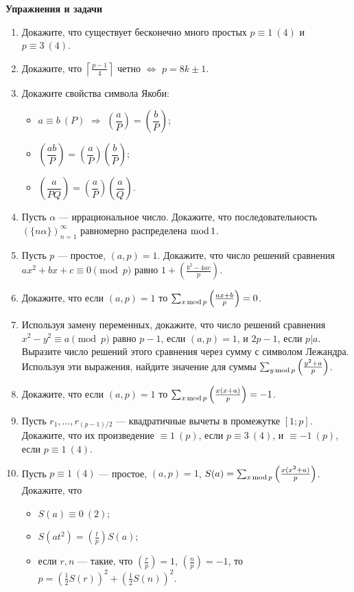 \noindent\textbf{Упражнения и задачи}

\begin{enumerate}[topsep=0pt]
    \item Докажите, что существует бесконечно много простых $p\equiv 1\ (4)$ и $p\equiv 3\ (4)$.
    \item Докажите, что $\left \lceil \frac{p-1}{4} \right \rceil $  четно $\Leftrightarrow$ $p=8k \pm 1$.
    \item Докажите свойства символа Якоби:
    \begin{itemize}[noitemsep,topsep=0pt]
        \item $a\equiv b\ (P)$ $\Rightarrow$ $\left(\dfrac{a}{P}\right)=\left(\dfrac{b}{P}\right)$;
        \item $\left(\dfrac{ab}{P}\right)=\left(\dfrac{a}{P}\right)\left(\dfrac{b}{P}\right)$;
        \item $\left(\dfrac{a}{PQ}\right)=\left(\dfrac{a}{P}\right)\left(\dfrac{a}{Q}\right)$.
    \end{itemize}
    \item Пусть $\alpha$ --- иррациональное число. Докажите, что последовательность $(\{n\alpha\})_{n=1}^\infty$ равномерно распределена $\operatorname{mod} 1$.
    \item Пусть $p$ --- простое, $(a,p)=1$. Докажите, что число решений сравнения\\ $ax^2+bx+c \equiv 0 \pmod{p}$ равно $1+\left(\frac{b^2-4ac}{p}\right)$. %
    \item Докажите, что если $(a,p)=1$ то $\sum_{x \operatorname{mod} p} \left(\frac{ax+b}{p}\right)=0$. %
    \item Используя замену переменных, докажите, что число решений сравнения $x^2-y^2 \equiv a \pmod{p}$ равно $p-1$, если $(a,p)=1$, и $2p-1$, если $p|a$. Выразите число решений этого сравнения через сумму с символом Лежандра. Используя эти выражения, найдите значение для суммы $\sum_{y \operatorname{mod} p} \left(\frac{y^2+a}{p}\right)$. %
    \item Докажите, что если $(a,p)=1$ то $\sum_{x \operatorname{mod} p} \left(\frac{x(x+a)}{p}\right)=-1$. %
    \item Пусть $r_1, \dots, r_{(p-1)/2}$ --- квадратичные вычеты в промежутке $[1;p]$. Докажите, что их произведение $\equiv 1\ (p)$, если $p \equiv 3\ (4)$, и  $\equiv -1\ (p)$, если $p \equiv 1\ (4)$. %
    
    \item Пусть $p \equiv 1\ (4)$ --- простое, $(a,p)=1$, $S(a) = \sum_{x \operatorname{mod} p} \left(\frac{x(x^2+a)}{p}\right)$. Докажите, что 
    \begin{itemize}[noitemsep,topsep=0pt]
        \item $S(a)\equiv 0\ (2)$;
        \item $S(at^2)= \left(\frac{t}{p}\right) S(a)$;
        \item если $r, n$ --- такие, что $\left(\frac{r}{p}\right)=1$, $\left(\frac{n}{p}\right)=-1$, то $p=\left(\frac{1}{2}S(r)\right)^2+\left(\frac{1}{2}S(n)\right)^2$.
    \end{itemize}


\end{enumerate}
